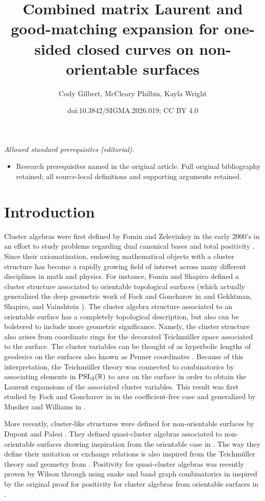\documentclass[10pt,a4paper]{amsart}
\title{Combined matrix Laurent and good-matching expansion for one-sided closed curves on non-orientable surfaces}
\author{Cody Gilbert, McCleary Philbin, Kayla Wright}
\date{doi:10.3842/SIGMA.2026.019; CC BY 4.0}
\numberwithin{equation}{section}
\theoremstyle{definition}
\begin{document}
\maketitle
\noindent\textit{Allowed standard prerequisites (editorial).}\begin{itemize}
\item Research prerequisites named in the original article. Full original bibliography retained; all source-local definitions and supporting arguments retained.
\end{itemize}\medskip
\section{Introduction}

Cluster algebras were first defined by Fomin and Zelevinksy in the early 2000's in an effort to study problems regarding dual canonical bases and total positivity \cite{FZ02}. Since their axiomatization, endowing mathematical objects with a cluster structure has become a rapidly growing field of interest across many different disciplines in math and physics. For instance, Fomin and Shapiro defined a cluster structure associated to orientable topological surfaces (which actually generalized the deep geometric work of Fock and Goncharov in \cite{FG06, FG07} and Gekhtman, Shapiro, and Vainshtein \cite{GSV05}). The cluster algebra structure associated to an orientable surface has a completely topological description, but also can be bolstered to include more geometric significance. Namely, the cluster structure also arises from coordinate rings for the decorated Teichm\"uller space associated to the surface. The cluster variables can be thought of as hyperbolic lengths of geodesics on the surfaces also known as Penner coordinates \cite{P87}. Because of this interpretation, the Teichm\"uller theory was connected to combinatorics by associating elements in ${\rm PSL}_2(\mathbb{R})$ to arcs on the surface in order to obtain the Laurent expansions of the associated cluster variables. This result was first studied by Fock and Goncharov in \cite{FG06, FG07} in the coefficient-free case and generalized by Musiker and Williams in \cite{MW13}.

More recently, cluster-like structures were defined for non-orientable surfaces by Dupont and Palesi \cite{DP15}. They defined quasi-cluster algebras associated to non-orientable surfaces drawing inspiration from the orientable case in \cite{FST08}. The way they define their mutation or exchange relations is also inspired from the Teichm\"uller theory and geometry from \cite{FG06, FG07}. Positivity for quasi-cluster algebras was recently proven by Wilson through using snake and band graph combinatorics in \cite{Wil19} inspired by the original proof for positivity for cluster algebras from orientable surfaces in \cite{MSW11}.
\end{document}
